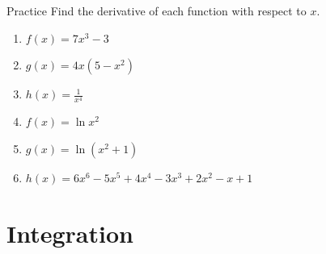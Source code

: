 \documentclass[]{beamer}
\begin{document}
    \begin{frame}{Practice}
        Find the derivative of each function with respect to $x$.
        \begin{enumerate}
            \item $f(x) = 7x^3 -3$
            \item $g(x) = 4x(5-x^2)$
            \item $h(x) = \frac{1}{x^4}$
            \item $f(x) = \ln x^2$
            \item $g(x) = \ln (x^2 + 1)$
            \item $h(x) = 6x^6 - 5x^5 + 4x^4 - 3x^3 + 2x^2 - x + 1$
        \end{enumerate}
    \end{frame}

\section{Integration}
\end{document}
